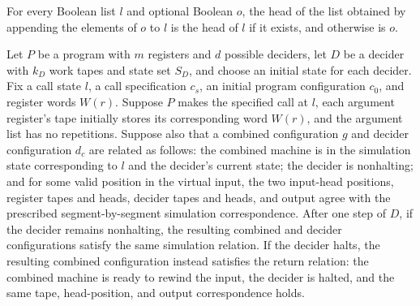 \begin{lemma}
\leanok
{}
For every Boolean list $l$ and optional Boolean $o$, the head of the list obtained by
appending the elements of $o$ to $l$ is the head of $l$ if it exists, and otherwise is
$o$.
\end{lemma}

\begin{theorem}
\label{Complexity.LogProg.sim_step}
\leanok
{}
Let $P$ be a program with $m$ registers and $d$ possible deciders, let $D$ be a decider
with $k_D$ work tapes and state set $S_D$, and choose an initial state for each decider.
Fix a call state $l$, a call specification $c_s$, an initial program configuration
$c_0$, and register words $W(r)$. Suppose $P$ makes the specified call at $l$, each
argument register's tape initially stores its corresponding word $W(r)$, and the
argument list has no repetitions. Suppose also that a combined configuration $g$ and
decider configuration $d_c$ are related as follows: the combined machine is in the
simulation state corresponding to $l$ and the decider's current state; the decider is
nonhalting; and for some valid position in the virtual input, the two input-head
positions, register tapes and heads, decider tapes and heads, and output agree with the
prescribed segment-by-segment simulation correspondence. After one step of $D$, if the
decider remains nonhalting, the resulting combined and decider configurations satisfy
the same simulation relation. If the decider halts, the resulting combined configuration
instead satisfies the return relation: the combined machine is ready to rewind the
input, the decider is halted, and the same tape, head-position, and output
correspondence holds.
\end{theorem}

